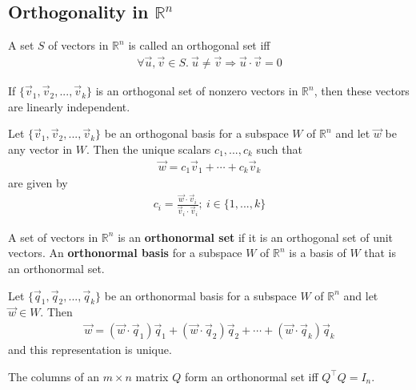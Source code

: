 \documentclass{article}
\begin{document}
\subsection{Orthogonality in $\mathbb{R}^n$}
\begin{definition}
    A set $S$ of vectors in $\mathbb{R}^n$ is called an orthogonal set iff
    \begin{align*}
        \forall \vec u, \vec v\in S.\: \vec u \not= \vec v \Rightarrow \vec u \cdot \vec v = 0
    \end{align*}
\end{definition}
\begin{theorem}
    If $\{\vec v_1, \vec v_2, ...,\vec v_k\}$ is an orthogonal set of nonzero vectors in $\mathbb{R}^n$, then these vectors are linearly independent.
\end{theorem}
\begin{theorem}
    Let $\{\vec v_1, \vec v_2, ..., \vec v_k\}$ be an orthogonal basis for a subspace $W$ of $\mathbb{R}^n$ and let $\vec w$ be any vector in $W$. Then the unique scalars $c_1, ..., c_k$ such that
    \begin{align*}
        \vec w = c_1\vec v_1 + \cdots + c_k\vec v_k
    \end{align*}
    are given by
    \begin{align*}
        c_i = \frac{\vec w \cdot \vec v_i}{\vec v_i \cdot \vec v_i}; \: i \in \{1, ..., k\}
    \end{align*}
\end{theorem}
\begin{definition}
    A set of vectors in $\mathbb{R}^n$ is an \textbf{orthonormal set} if it is an orthogonal set of unit vectors. An \textbf{orthonormal basis} for a subspace $W$ of $\mathbb{R}^n$ is a basis of $W$ that is an orthonormal set.
\end{definition}
\begin{theorem}
    Let $\{\vec q_1, \vec q_2, ..., \vec q_k\}$ be an orthonormal basis for a subspace $W$ of $\mathbb{R}^n$ and let $\vec w\in W$. Then
    \begin{align*}
        \vec w = (\vec w \cdot \vec q_1)\vec q_1 + (\vec w\cdot\vec q_2)\vec q_2 + \cdots + (\vec w\cdot\vec q_k)\vec q_k
    \end{align*}
    and this representation is unique.
\end{theorem}
\begin{theorem}
    The columns of an $m\times n$ matrix $Q$ form an orthonormal set iff $Q^\intercal Q=I_n$.
\end{theorem}
\end{document}
